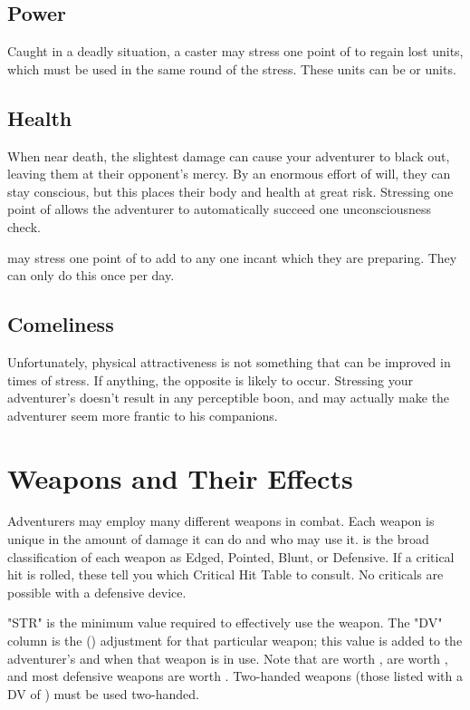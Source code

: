 \begin{multicols*}{2}
\subsection{Power}
Caught in a deadly situation, a caster may stress one point of \PWR to regain  lost units, which must be used in the same round of the stress. These units can be  or  units.
\subsection{Health}
When near death, the slightest damage can cause your adventurer to black out, leaving them at their opponent's mercy. By an enormous effort of will, they can stay conscious, but this places their body and health at great risk. Stressing one point of \HEA allows the adventurer to automatically succeed one unconsciousness check.

 may stress one point of \HEA to add  to any one incant which they are preparing. They can only do this once per day.
\subsection{Comeliness}
Unfortunately, physical attractiveness is not something that can be improved in times of stress. If anything, the opposite is likely to occur. Stressing your adventurer's \COM doesn't result in any perceptible boon, and may actually make the adventurer seem more frantic to his companions.
\section{Weapons and Their Effects}
Adventurers may employ many different weapons in combat. Each weapon is unique in the amount of damage it can do and who may use it.
 is the broad classification of each
weapon as Edged, Pointed, Blunt, or Defensive. If a critical hit is rolled, these tell you which Critical Hit Table to consult. No criticals are possible with a defensive device.

"STR" is the minimum \STR value required to effectively use the weapon. The "DV" column is the  (\DV) adjustment for that particular weapon; this value is added to the adventurer's \CDV and \GDV when that weapon is in use. Note that  are worth ,  are worth , and most defensive weapons are worth . Two-handed weapons (those listed with a DV of ) must be used two-handed.


\end{multicols*}
